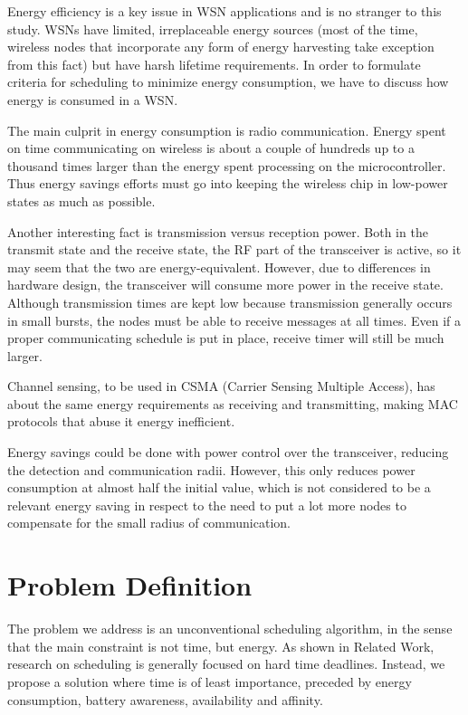 Energy efficiency is a key issue in WSN applications and is no stranger to this study. WSNs have limited, irreplaceable energy sources (most of the time,
wireless nodes that incorporate any form of energy harvesting take exception from this fact) but have harsh lifetime requirements. In order to formulate 
criteria for scheduling to minimize energy consumption, we have to discuss how energy is consumed in a WSN. 

The main culprit in energy consumption is radio communication. Energy spent on time communicating on wireless is about a couple of hundreds up to a thousand times
larger than the energy spent processing on the microcontroller. Thus energy savings efforts must go into keeping the wireless chip in low-power states as much as possible.

Another interesting fact is transmission versus reception power. Both in the transmit state and the receive state, the RF part of the transceiver is active, so it may
seem that the two are energy-equivalent. However, due to differences in hardware design, the transceiver will consume more power in the receive state. Although 
transmission times are kept low because transmission generally occurs in small bursts, the nodes must be able to receive messages at all times. Even if a proper
communicating schedule is put in place, receive timer will still be much larger.

Channel sensing, to be used in CSMA (Carrier Sensing Multiple Access), has about the same energy requirements as receiving and transmitting, making MAC protocols that abuse
it energy inefficient.

Energy savings could be done with power control over the transceiver, reducing the detection and communication radii. 
However, this only reduces power consumption at almost half the initial value, which is not considered to be a relevant
energy saving in respect to the need to put a lot more nodes to compensate for the small radius of communication. 


\section{Problem Definition}
\label{sec:problem}

The problem we address is an unconventional scheduling algorithm, in the sense that the main constraint is not time, but energy. As shown in Related
Work, research on scheduling is generally focused on hard time deadlines. Instead, we propose a solution where time is of least importance, preceded 
by energy consumption, battery awareness, availability and affinity.

